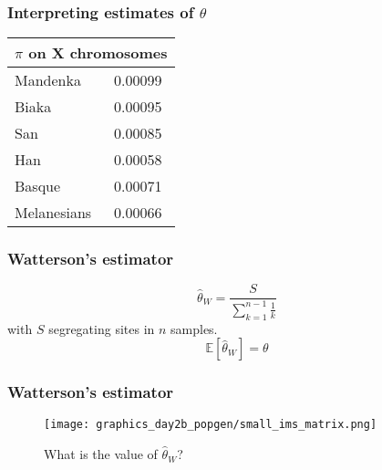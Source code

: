 \documentclass{beamer}
\newcommand{\E}{\mathbb{E}}
\newcommand{\1}{\ensuremath{\mathbf{1}}}
\begin{document}
%
%
%
\begin{frame}\frametitle{Interpreting estimates of $\theta$}
	\begin{center}
		\begin{tabular}{ll}
			\toprule
			\multicolumn{2}{l}{$\pi$ on X chromosomes}	\\
			\midrule
			Mandenka	& 0.00099	\\
			Biaka		& 0.00095	\\
			San			& 0.00085	\\
			Han			& 0.00058	\\
			Basque		& 0.00071	\\
			Melanesians	& 0.00066	\\
			\bottomrule
	   	\end{tabular}	
	\end{center}
\end{frame}
%
%
%
\begin{frame}\frametitle{Watterson’s estimator}
	\begin{equation}
		\hat{\theta}_W = \frac{S}{\sum_{k=1}^{n-1}\tfrac{1}{k}}
	\end{equation}
	with $S$ segregating sites in $n$ samples.
	\begin{equation}
		\E [\hat{\theta}_W] = \theta
	\end{equation}
\end{frame}
%
%
%
\begin{frame}\frametitle{Watterson’s estimator}
	\begin{figure}
	\begin{center}
		\texttt{[image: graphics\_day2b\_popgen/small\_ims\_matrix.png]}
	\end{center}
	\caption{What is the value of $\hat\theta_W$?}
	\end{figure}
\end{frame}
\end{document}
